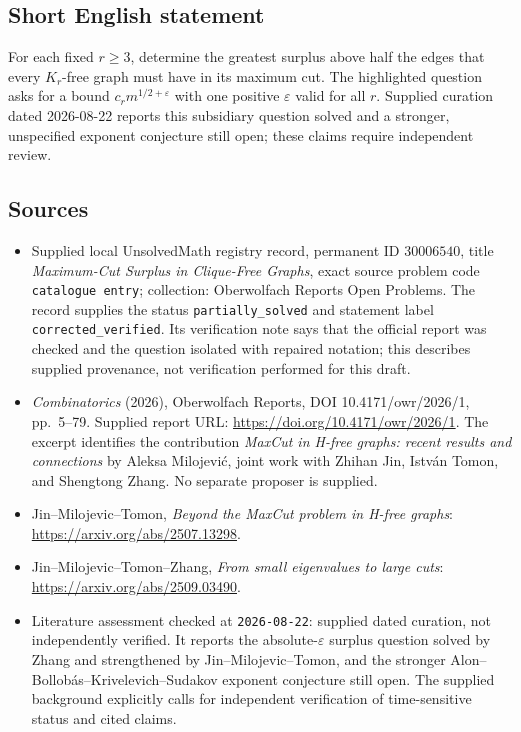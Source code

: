 \documentclass[11pt]{article}
\begin{document}
\subsection{Short English statement}
For each fixed \(r\geq 3\), determine the greatest surplus above half the edges that every \(K_r\)-free graph must have in its maximum cut. The highlighted question asks for a bound \(c_r m^{1/2+\varepsilon}\) with one positive \(\varepsilon\) valid for all \(r\). Supplied curation dated 2026-08-22 reports this subsidiary question solved and a stronger, unspecified exponent conjecture still open; these claims require independent review.
\subsection{Sources}
\begin{itemize}
\item Supplied local UnsolvedMath registry record, permanent ID \(30006540\), title \emph{Maximum-Cut Surplus in Clique-Free Graphs}, exact source problem code \texttt{catalogue entry}; collection: Oberwolfach Reports Open Problems. The record supplies the status \texttt{partially\_solved} and statement label \texttt{corrected\_verified}. Its verification note says that the official report was checked and the question isolated with repaired notation; this describes supplied provenance, not verification performed for this draft.
\item \emph{Combinatorics} (2026), Oberwolfach Reports, DOI 10.4171/owr/2026/1, pp.\ 5--79. Supplied report URL: \url{https://doi.org/10.4171/owr/2026/1}. The excerpt identifies the contribution \emph{MaxCut in H-free graphs: recent results and connections} by Aleksa Milojevi\'c, joint work with Zhihan Jin, Istv\'an Tomon, and Shengtong Zhang. No separate proposer is supplied.
\item Jin--Milojevic--Tomon, \emph{Beyond the MaxCut problem in H-free graphs}: \url{https://arxiv.org/abs/2507.13298}.
\item Jin--Milojevic--Tomon--Zhang, \emph{From small eigenvalues to large cuts}: \url{https://arxiv.org/abs/2509.03490}.
\item Literature assessment checked at \texttt{2026-08-22}: supplied dated curation, not independently verified. It reports the absolute-\(\varepsilon\) surplus question solved by Zhang and strengthened by Jin--Milojevic--Tomon, and the stronger Alon--Bollob\'as--Krivelevich--Sudakov exponent conjecture still open. The supplied background explicitly calls for independent verification of time-sensitive status and cited claims.
\end{itemize}
\end{document}
